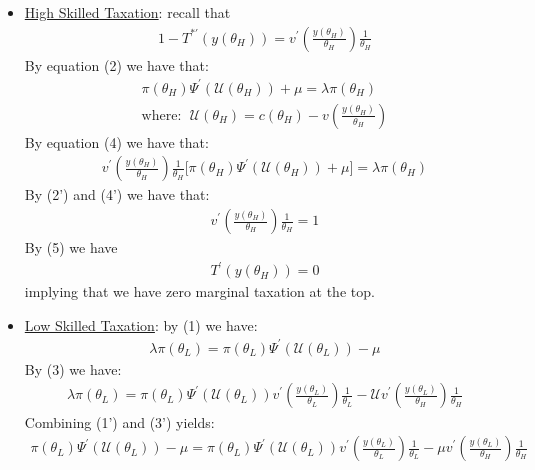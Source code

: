 \documentclass{article}
\begin{document}
\begin{itemize}
\begin{itemize}
\begin{itemize}
            \item \underline{High Skilled Taxation}: recall that
            \begin{gather*}
                1 - T^{*'}(y(\theta_{H})) = v^{'}(\frac{y(\theta_{H})}{\theta_{H}}) \frac{1}{\theta_{H}}
            \end{gather*}
            By equation (2) we have that:
            \begin{gather*}
                \pi(\theta_{H}) \Psi^{'}(\mathcal{U}(\theta_{H})) + \mu = \lambda \pi(\theta_{H}) \tag{2'} \\
                \text{where}: \ \ \mathcal{U}(\theta_{H}) = c(\theta_{H}) - v(\frac{y(\theta_{H})}{\theta_{H}})
            \end{gather*}
            By equation (4) we have that:
            \begin{gather*}
                v^{'}(\frac{y(\theta_{H})}{\theta_{H}}) \frac{1}{\theta_{H}} \big[\pi(\theta_{H})\Psi^{'}(\mathcal{U}(\theta_{H}))+\mu] = \lambda \pi(\theta_{H}) \tag{4'}
            \end{gather*}
            By (2') and (4') we have that:
            \begin{gather*}
                v^{'}(\frac{y(\theta_{H})}{\theta_{H}}) \frac{1}{\theta_{H}} = 1 \tag{*}
            \end{gather*}
            By (5) we have
            \begin{gather*}
                T^{'}(y(\theta_{H})) = 0 \tag{**}
            \end{gather*}
            implying that we have zero marginal taxation at the top.
            \item  \underline{Low Skilled Taxation}: by (1) we have:
            \begin{gather*}
                \lambda \pi(\theta_{L}) = \pi(\theta_{L}) \Psi^{'}(\mathcal{U}(\theta_{L})) - \mu \tag{1'}
            \end{gather*}
            By (3) we have:
            \begin{gather*}
            \lambda \pi (\theta_{L}) = \pi (\theta_{L}) \Psi^{'} (\mathcal{U}(\theta_{L})) v^{'}(\frac{y(\theta_{L})}{\theta_{L}}) \frac{1}{\theta_{L}} - \mathcal{U} v^{'} (\frac{y(\theta_{L})}{\theta_{H}}) \frac{1}{\theta_{H}} \tag{3'}
            \end{gather*}
            Combining (1') and (3') yields:
            \begin{gather*}
                \pi(\theta_{L}) \Psi^{'}(\mathcal{U}(\theta_{L})) - \mu = \pi(\theta_{L}) \Psi^{'} (\mathcal{U}(\theta_{L})) v^{'}(\frac{y(\theta_{L})}{\theta_{L}}) \frac{1}{\theta_{L}} - \mu v^{'} (\frac{y(\theta_{L})}{\theta_{H}}) \frac{1}{\theta_{H}} \\

\end{gather*}
\end{itemize}
\end{itemize}
\end{itemize}
\end{document}
